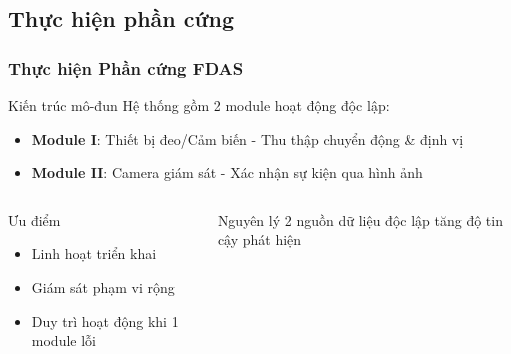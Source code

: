 \subsection{Thực hiện phần cứng}
\begin{frame}
\frametitle{Thực hiện Phần cứng FDAS}

\begin{block}{Kiến trúc mô-đun}
Hệ thống gồm 2 module hoạt động độc lập:
\begin{itemize}
\item \textbf{Module I}: Thiết bị đeo/Cảm biến - Thu thập chuyển động \& định vị
\item \textbf{Module II}: Camera giám sát - Xác nhận sự kiện qua hình ảnh
\end{itemize}
\end{block}

\begin{columns}
\begin{alertblock}{Ưu điểm}
\begin{itemize}
\item Linh hoạt triển khai
\item Giám sát phạm vi rộng  
\item Duy trì hoạt động khi 1 module lỗi
\end{itemize}
\end{alertblock}

\begin{block}{Nguyên lý}
2 nguồn dữ liệu độc lập tăng độ tin cậy phát hiện
\end{block}
\end{columns}

\end{frame}

